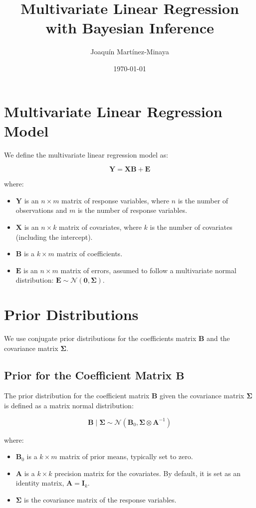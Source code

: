 \documentclass{article}
\title{Multivariate Linear Regression with Bayesian Inference}
\author{Joaquín Martínez-Minaya}
\date{\today}
\begin{document}
\maketitle

\section{Multivariate Linear Regression Model}

We define the multivariate linear regression model as:

\[
\bm{Y} = \bm{X} \bm{B} + \bm{E}
\]

where:
\begin{itemize}
    \item \(\bm{Y}\) is an \(n \times m\) matrix of response variables, where \(n\) is the number of observations and \(m\) is the number of response variables.
    \item \(\bm{X}\) is an \(n \times k\) matrix of covariates, where \(k\) is the number of covariates (including the intercept).
    \item \(\bm{B}\) is a \(k \times m\) matrix of coefficients.
    \item \(\bm{E}\) is an \(n \times m\) matrix of errors, assumed to follow a multivariate normal distribution: \(\bm{E} \sim \mathcal{N}(\bm{0}, \bm{\Sigma})\).
\end{itemize}

\section{Prior Distributions}

We use conjugate prior distributions for the coefficients matrix \(\bm{B}\) and the covariance matrix \(\bm{\Sigma}\).

\subsection{Prior for the Coefficient Matrix \(\bm{B}\)}

The prior distribution for the coefficient matrix \(\bm{B}\) given the covariance matrix \(\bm{\Sigma}\) is defined as a matrix normal distribution:

\[
\bm{B} \mid \bm{\Sigma} \sim \mathcal{N}(\bm{B}_0, \bm{\Sigma} \otimes \bm{A}^{-1})
\]

where:
\begin{itemize}
    \item \(\bm{B}_0\) is a \(k \times m\) matrix of prior means, typically set to zero.
    \item \(\bm{A}\) is a \(k \times k\) precision matrix for the covariates. By default, it is set as an identity matrix, \(\bm{A} = \bm{I}_k\).
    \item \(\bm{\Sigma}\) is the covariance matrix of the response variables.
\end{itemize}
\end{document}
